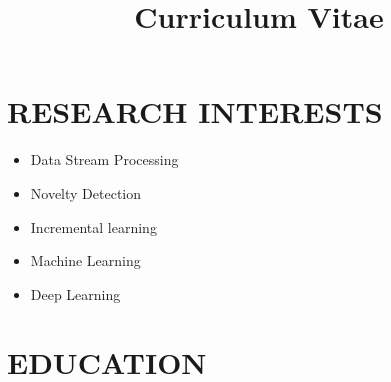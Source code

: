 \documentclass[10pt,a4paper,sans]{moderncv} %
\title{Curriculum Vitae}
\begin{document}
	
\makecvtitle




\section{RESEARCH INTERESTS}
\begin{itemize}
	\item{Data Stream Processing}
	\vspace{3pt}
	\item{Novelty Detection}
	\vspace{3pt}
	\item{Incremental learning}
	\vspace{3pt}
	\item{Machine Learning}
	\vspace{3pt}
	\item{Deep Learning}
	\vspace{3pt}
\end{itemize}

\section{EDUCATION}
\end{document}
